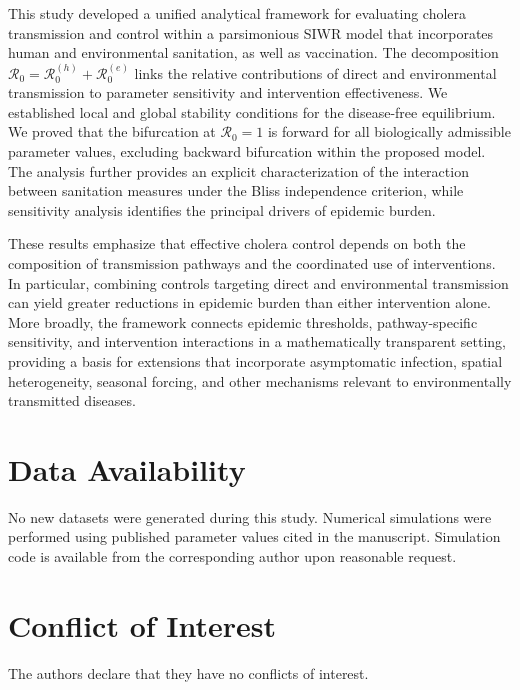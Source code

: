 \documentclass[11pt]{article}
\theoremstyle{plain}
\theoremstyle{definition}
\theoremstyle{remark}
\newcommand{\Rz}{\mathcal{R}_0}
\newcommand{\Rzh}{\mathcal{R}_0^{(h)}}
\newcommand{\Rze}{\mathcal{R}_0^{(e)}}
\begin{document}
This study developed a unified analytical framework for evaluating cholera transmission and control within a parsimonious SIWR model that incorporates human and environmental sanitation, as well as vaccination. The decomposition $\Rz=\Rzh+\Rze$ links the relative contributions of direct and environmental transmission to parameter sensitivity and intervention effectiveness. We established local and global stability conditions for the disease-free equilibrium. We proved that the bifurcation at $\Rz=1$ is forward for all biologically admissible parameter values, excluding backward bifurcation within the proposed model. The analysis further provides an explicit characterization of the interaction between sanitation measures under the Bliss independence criterion, while sensitivity analysis identifies the principal drivers of epidemic burden.

These results emphasize that effective cholera control depends on both the composition of transmission pathways and the coordinated use of interventions. In particular, combining controls targeting direct and environmental transmission can yield greater reductions in epidemic burden than either intervention alone. More broadly, the framework connects epidemic thresholds, pathway-specific sensitivity, and intervention interactions in a mathematically transparent setting, providing a basis for extensions that incorporate asymptomatic infection, spatial heterogeneity, seasonal forcing, and other mechanisms relevant to environmentally transmitted diseases.

\section*{Data Availability}
No new datasets were generated during this study. Numerical simulations were performed using published parameter values cited in the manuscript. Simulation code is available from the corresponding author upon reasonable request.


\section*{Conflict of Interest}
The authors declare that they have no conflicts of interest.
\end{document}

